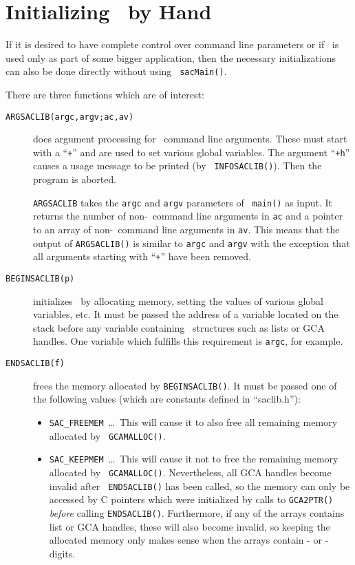 \section{Initializing \saclib\ by Hand}
\label{c:CFC s:IS}

If it is desired to have complete control over command line parameters or
if \saclib\ is used only as part of some bigger application, then the
necessary initializations can also be done directly without using {\tt
sacMain()}.

There are three functions which are of interest:
\begin{description}
\item[{\tt ARGSACLIB(argc,argv;ac,av)}]
  does argument processing for \saclib\ command line arguments. These must
  start with a ``{\tt +}'' and are used to set various global variables. The
  argument ``{\tt +h}'' causes a usage message to be printed (by {\tt
  INFOSACLIB()}). Then the program is aborted.

  {\tt ARGSACLIB} takes the {\tt argc} and {\tt argv} parameters of {\tt
  main()} as input. It returns the number of non-\saclib\ command line
  arguments in {\tt ac} and a pointer to an array of non-\saclib\ command line
  arguments in {\tt av}. This means that the output of {\tt ARGSACLIB()} is
  similar to {\tt argc} and {\tt argv} with the exception that all arguments
  starting with ``{\tt +}'' have been removed.
\item[{\tt BEGINSACLIB(p)}]
  initializes \saclib\ by allocating memory, setting the values of various
  global variables, etc. It must be passed the address of a variable
  located on the stack before any variable containing \saclib\ structures
  such as lists or GCA handles. One variable which fulfills this requirement is
  {\tt argc}, for example.
\item[{\tt ENDSACLIB(f)}]
  frees the memory allocated by {\tt BEGINSACLIB()}. It must be passed one of
  the following values (which are constants defined in ``saclib.h''):
  \begin{itemize}
  \item {\tt SAC\_FREEMEM}\ \ldots\
    This will cause it to also free all remaining memory allocated by {\tt
    GCAMALLOC()}.
  \item {\tt SAC\_KEEPMEM}\ \ldots\
    This will cause it not to free the remaining memory allocated by {\tt
    GCAMALLOC()}. Nevertheless, all GCA handles become invalid after {\tt
    ENDSACLIB()} has been called, so the memory can only be accessed by C
    pointers which were initialized by calls to {\tt GCA2PTR()} {\em
    before} calling {\tt ENDSACLIB()}. Furthermore, if any of the arrays
    contains list or GCA handles, these will also become invalid, so keeping
    the allocated memory only makes sense when the arrays contain \BETA- or
    \GAMMA-digits. 


\end{itemize}
\end{description}
